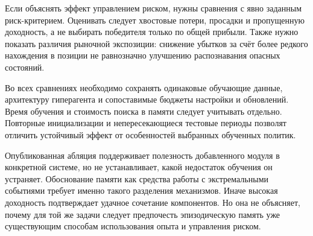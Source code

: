 \documentclass[9pt,a4paper,twocolumn]{extarticle}
\begin{document}
Если объяснять эффект управлением риском, нужны сравнения с явно заданным риск-критерием.
Оценивать следует хвостовые потери, просадки и пропущенную доходность, а не выбирать победителя
только по общей прибыли. Также нужно показать различия рыночной экспозиции: снижение убытков за
счёт более редкого нахождения в позиции не равнозначно улучшению распознавания опасных
состояний.

Во всех сравнениях необходимо сохранять одинаковые обучающие данные, архитектуру гиперагента и
сопоставимые бюджеты настройки и обновлений. Время обучения и стоимость поиска в памяти следует
учитывать отдельно. Повторные инициализации и непересекающиеся тестовые периоды позволят
отличить устойчивый эффект от особенностей выбранных обученных политик.

Опубликованная абляция поддерживает полезность добавленного модуля в конкретной системе, но не
устанавливает, какой недостаток обучения он устраняет. Обоснование памяти как средства работы с
экстремальными событиями требует именно такого разделения механизмов. Иначе высокая доходность
подтверждает удачное сочетание компонентов. Но она не объясняет, почему для той же задачи
следует предпочесть эпизодическую память уже существующим способам использования опыта и
управления риском.

\end{document}
